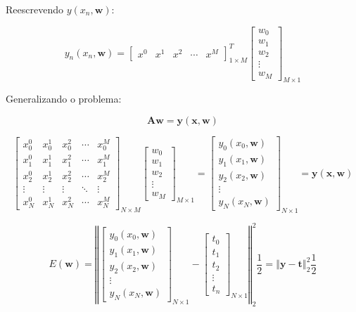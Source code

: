 \documentclass{article}
\begin{document}
  Reescrevendo $y(x_{n},\mathbf{w})$:
  
 \[
  y_{n}(x_{n},\mathbf{w}) = \left[\begin{array}{ccccc}
  	x^{0} & x^{1} & x^{2} & \cdots & x^{M}\end{array}\right]_{1\times M}^{T}\left[\begin{array}{c}
 	w_{0}\\
 	w_{1}\\
 	w_{2}\\
 	\vdots\\
 	w_{M}
 \end{array}\right]_{M\times1}
 \]
 
 Generalizando o problema:
 
 \[
   \mathbf{A} \mathbf{w} =\mathbf{y}(\mathbf{x},\mathbf{w})
 \]
 
 \[
 \left[\begin{array}{ccccc}
 	x_{0}^{0} & x_{0}^{1} & x_{0}^{2} & \cdots & x_{0}^{M}\\
 	x_{1}^{0} & x_{1}^{1} & x_{1}^{2} & \cdots & x_{1}^{M}\\
 	x_{2}^{0} & x_{2}^{1} & x_{2}^{2} & \cdots & x_{2}^{M}\\
 	\vdots & \vdots & \vdots & \ddots & \vdots\\
 	x_{N}^{0} & x_{N}^{1} & x_{N}^{2} & \cdots & x_{N}^{M}
 \end{array}\right]_{N\times M}\left[\begin{array}{c}
 	w_{0}\\
 	w_{1}\\
 	w_{2}\\
 	\vdots\\
 	w_{M}
 \end{array}\right]_{M\times1}=\left[\begin{array}{c}
 	y_{0}(x_{0},\mathbf{w})\\
 	y_{1}(x_{1},\mathbf{w})\\
 	y_{2}(x_{2},\mathbf{w})\\
 	\vdots\\
 	y_{N}(x_{N},\mathbf{w})
 \end{array}\right]_{N\times1} = \mathbf{y}(\mathbf{x},\mathbf{w})
 \]
  
  \[
  E(\mathbf{w})=\left\Vert \left[\begin{array}{c}
  	y_{0}(x_{0},\mathbf{w})\\
  	y_{1}(x_{1},\mathbf{w})\\
  	y_{2}(x_{2},\mathbf{w})\\
  	\vdots\\
  	y_{N}(x_{N},\mathbf{w})
  \end{array}\right]_{N\times1}-\left[\begin{array}{c}
  	t_{0}\\
  	t_{1}\\
  	t_{2}\\
  	\vdots\\
  	t_{n}
  \end{array}\right]_{N\times1}\right\Vert _{2}^{2}\frac{1}{2}=\left\Vert \mathbf{y}-\mathbf{t}\right\Vert _{2}^{2}\frac{1}{2}
  \]
  
\end{document}
